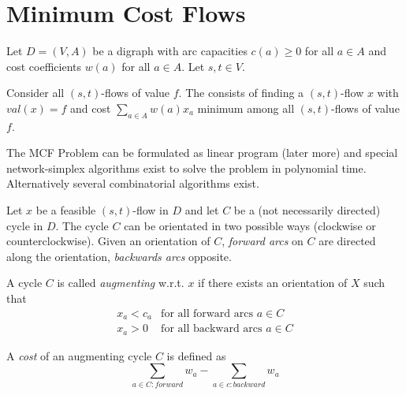 \begin{lec}[2011-12-08]\end{lec}
\section*{Minimum Cost Flows}

\begin{defn}
Let $D = (V, A)$ be a digraph with arc capacities $c(a) \geq 0$ for all $a
\in A$ and cost coefficients $w(a)$ for all $a \in A$. Let $s, t \in V$.

Consider all $(s, t)$-flows of value $f$. The  consists of finding a
$(s,t)$-flow $x$ with $val(x) = f$ and cost $\sum_{a \in A} w(a) x_a$
minimum among all $(s,t)$-flows of value $f$.
\end{defn}

The MCF Problem can be formulated as linear program (later more) and special
network-simplex algorithms exist to solve the problem in polynomial time.
Alternatively several combinatorial algorithms exist.

\begin{defn}
Let $x$ be a feasible $(s,t)$-flow in $D$ and let $C$ be a (not necessarily
directed) cycle in $D$. The cycle $C$ can be orientated in two possible ways
(clockwise or counterclockwise). Given an orientation of $C$, \emph{forward
arcs} on $C$ are directed along the orientation, \emph{backwards arcs} opposite.

A cycle $C$ is called \emph{augmenting} w.r.t. $x$ if there exists an
orientation of $X$ such that
\begin{align*}
x_a < c_a & \text{for all forward arcs } a \in C \\
x_a > 0	& \text{for all backward arcs } a \in C
\end{align*}
\end{defn}

\begin{defn}
A \emph{cost} of an augmenting cycle $C$ is defined as
\[
\sum_{a \in C: forward} w_a - \sum_{a \in c: backward} w_a
\]
\end{defn}

